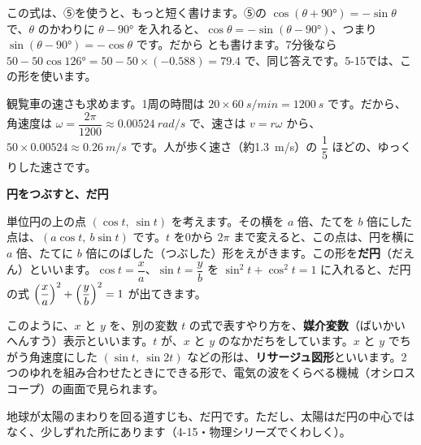 この式は、⑤を使うと、もっと短く書けます。⑤の $\cos(\theta+90°)=-\sin\theta$ で、$\theta$ のかわりに $\theta-90°$ を入れると、$\cos\theta=-\sin(\theta-90°)$、つまり $\sin(\theta-90°)=-\cos\theta$ です。だから
とも書けます。7分後なら $50-50\cos126°=50-50\times(-0.588)=79.4$ で、同じ答えです。5-15では、この形を使います。

観覧車の速さも求めます。1周の時間は $20\times\qty{60}{s/min}=\qty{1200}{s}$ です。だから、角速度は $\omega=\dfrac{2\pi}{1200}\approx\qty{0.00524}{rad/s}$ で、速さは $v=r\omega$ から、$50\times0.00524\approx\qty{0.26}{m/s}$ です。人が歩く速さ（約\qty{1.3}{m/s}）の $\dfrac{1}{5}$ ほどの、ゆっくりした速さです。



\begin{motto}[4]
\textbf{円をつぶすと、だ円}\par
単位円の上の点 $(\cos t,\ \sin t)$ を考えます。その横を $a$ 倍、たてを $b$ 倍にした点は、$(a\cos t,\ b\sin t)$ です。$t$ を0から $2\pi$ まで変えると、この点は、円を横に $a$ 倍、たてに $b$ 倍にのばした（つぶした）形をえがきます。この形を\textbf{だ円}（だえん）といいます。$\cos t=\dfrac{x}{a}$、$\sin t=\dfrac{y}{b}$ を $\sin^2t+\cos^2t=1$ に入れると、だ円の式 $\Bigl(\dfrac{x}{a}\Bigr)^2+\Bigl(\dfrac{y}{b}\Bigr)^2=1$ が出てきます。

このように、$x$ と $y$ を、別の変数 $t$ の式で表すやり方を、\textbf{媒介変数}（ばいかいへんすう）表示といいます。$t$ が、$x$ と $y$ のなかだちをしています。$x$ と $y$ でちがう角速度にした $(\sin t,\ \sin2t)$ などの形は、\textbf{リサージュ図形}といいます。2つのゆれを組み合わせたときにできる形で、電気の波をくらべる機械（オシロスコープ）の画面で見られます。

\begin{bkcenter}
\end{bkcenter}
地球が太陽のまわりを回る道すじも、だ円です。ただし、太陽はだ円の中心ではなく、少しずれた所にあります（4-15・物理シリーズでくわしく）。
\end{motto}

